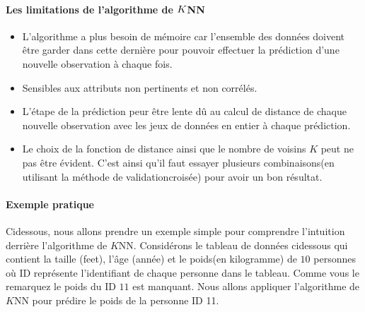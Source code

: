 \documentclass[letterpaper,11pt,english]{sphinxmanual}
\begin{document}
\paragraph{Les limitations de l’algorithme de \protect\(K\protect\)\sphinxhyphen{}NN}
\label{\detokenize{chapter3:les-limitations-de-lalgorithme-de-k-nn}}\begin{itemize}
\item {} 
\sphinxAtStartPar
L’algorithme a plus besoin de mémoire car l’ensemble des données
doivent être garder dans cette dernière pour pouvoir effectuer la
prédiction d’une nouvelle observation à chaque fois.

\item {} 
\sphinxAtStartPar
Sensibles aux attributs non pertinents et non corrélés.

\item {} 
\sphinxAtStartPar
L’étape de la prédiction peur être lente dû au calcul de distance de
chaque nouvelle observation avec les jeux de données en entier à
chaque prédiction.

\item {} 
\sphinxAtStartPar
Le choix de la fonction de distance ainsi que le nombre de voisins
\(K\) peut ne pas être évident. C’est ainsi qu’il faut essayer
plusieurs combinaisons(en utilisant la méthode de validation\sphinxhyphen{}croisée)
pour avoir un bon résultat.

\end{itemize}


\paragraph{Exemple pratique}
\label{\detokenize{chapter3:exemple-pratique}}
\sphinxAtStartPar
Ci\sphinxhyphen{}dessous, nous allons prendre un exemple simple pour comprendre
l’intuition derrière l’algorithme de \(K\)\sphinxhyphen{}NN. Considérons le
tableau de données ci\sphinxhyphen{}dessous qui contient la taille (feet), l’âge
(année) et le poids(en kilogramme) de \(10\) personnes où ID
représente l’identifiant de chaque personne dans le tableau. Comme vous
le remarquez le poids du ID \(11\) est manquant. Nous allons
appliquer l’algorithme de \(K\)\sphinxhyphen{}NN pour prédire le poids de la
personne ID 11.
\end{document}
